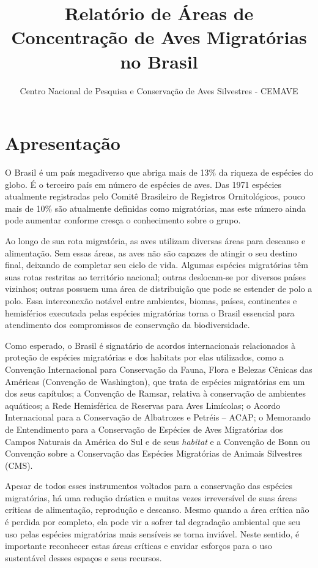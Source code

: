 \documentclass[
  oneside]{scrbook}
\title{Relatório de Áreas de Concentração de Aves Migratórias no Brasil}
\author{Centro Nacional de Pesquisa e Conservação de Aves Silvestres - CEMAVE}
\date{}
\begin{document}

\maketitle

{
\setcounter{tocdepth}{2}
\tableofcontents
}
\pagestyle{plain}

\hypertarget{apresentacao}{%
\chapter*{Apresentação}\label{apresentacao}}


O Brasil é um país megadiverso que abriga mais de 13\% da riqueza de espécies do globo. É o terceiro país em número de espécies de aves. Das 1971 espécies atualmente registradas pelo Comitê Brasileiro de Registros Ornitológicos, pouco mais de 10\% são atualmente definidas como migratórias, mas este número ainda pode aumentar conforme cresça o conhecimento sobre o grupo.

Ao longo de sua rota migratória, as aves utilizam diversas áreas para descanso e alimentação. Sem essas áreas, as aves não são capazes de atingir o seu destino final, deixando de completar seu ciclo de vida. Algumas espécies migratórias têm suas rotas restritas ao território nacional; outras deslocam-se por diversos países vizinhos; outras possuem uma área de distribuição que pode se estender de polo a polo. Essa interconexão notável entre ambientes, biomas, países, continentes e hemisférios executada pelas espécies migratórias torna o Brasil essencial para atendimento dos compromissos de conservação da biodiversidade.

Como esperado, o Brasil é signatário de acordos internacionais relacionados à proteção de espécies migratórias e dos habitats por elas utilizados, como a Convenção Internacional para Conservação da Fauna, Flora e Belezas Cênicas das Américas (Convenção de Washington), que trata de espécies migratórias em um dos seus capítulos; a Convenção de Ramsar, relativa à conservação de ambientes aquáticos; a Rede Hemisférica de Reservas para Aves Limícolas; o Acordo Internacional para a Conservação de Albatrozes e Petréis -- ACAP; o Memorando de Entendimento para a Conservação de Espécies de Aves Migratórias dos Campos Naturais da América do Sul e de seus \emph{habitat} e a Convenção de Bonn ou Convenção sobre a Conservação das Espécies Migratórias de Animais Silvestres (CMS).

Apesar de todos esses instrumentos voltados para a conservação das espécies migratórias, há uma redução drástica e muitas vezes irreversível de suas áreas críticas de alimentação, reprodução e descanso. Mesmo quando a área crítica não é perdida por completo, ela pode vir a sofrer tal degradação ambiental que seu uso pelas espécies migratórias mais sensíveis se torna inviável. Neste sentido, é importante reconhecer estas áreas críticas e envidar esforços para o uso sustentável desses espaços e seus recursos.
\end{document}
